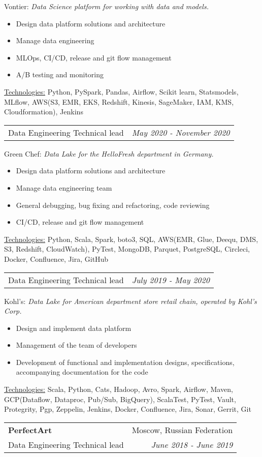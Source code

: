 \documentclass[letterpaper,11pt]{article}
\makeatletter
\newcommand{\sepsection}{\vspace{25pt}}
\newcommand{\resumeItem}[1]{%
  \item\small{
    #1
  }
}
\newcommand{\resumeSubheading}[4]{
  \vspace{8pt}\item%
    \begin{tabular*}{0.97\textwidth}[t]{l@{\extracolsep{\fill}}r}
      \textbf{#1} & #2 \\
      \textnormal{#3} & \textit{\small #4} \\
    \end{tabular*}\vspace{-5pt}
}
\newcommand{\resumeSubSubheading}[2]{
    \vspace{5pt}
    \begin{tabular*}{0.97\textwidth}{l@{\extracolsep{\fill}}r}
      \textnormal{#1} & \textit{\small #2} \\
    \end{tabular*}\vspace{-5pt}
}
\newcommand{\resumeProjectDescription}[2]{\vspace{5pt} \textnormal{#1:} \textit{\small#2}}
\newcommand{\resumeItemListStart}{\begin{itemize}}
\newcommand{\resumeItemListEnd}{\end{itemize}\vspace{-5pt}}
\newcommand{\resumeTech}[2]{
 \underline{#1:} #2
}
\makeatother
\begin{document}
      \resumeProjectDescription{Vontier}{Data Science platform for working with data and models.}

      \resumeItemListStart
      \resumeItem{Design data platform solutions and architecture}
      \resumeItem{Manage data engineering}
      \resumeItem{MLOps, CI/CD, release and git flow management}
      \resumeItem{A/B testing and monitoring}
      \resumeItemListEnd
      \resumeTech{Technologies}{Python, PySpark, Pandas, Airflow, Scikit learn, Statsmodels, MLflow, AWS(S3, EMR, EKS, Redshift, Kinesis, SageMaker, I​AM, KMS, Cloudformation), Jenkins}

    \resumeSubSubheading
      {Data Engineering Technical lead}{May 2020 - November 2020}

      \resumeProjectDescription{Green Chef}{Data Lake for the HelloFresh department in Germany.}

      \resumeItemListStart
      \resumeItem{Design data platform solutions and architecture}
      \resumeItem{Manage data engineering team}
      \resumeItem{General debugging, bug fixing and refactoring, code reviewing}
      \resumeItem{CI/CD, release and git flow management}
      \resumeItemListEnd
      \resumeTech{Technologies}{Python, Scala, Spark, boto3, SQL, AWS(EMR, Glue, Deequ, DMS, S3, Redshift, CloudWatch), PyTest, MongoDB, Parquet, PostgreSQL, Circleci, Docker, Confluence, Jira, GitHub}

    \resumeSubSubheading
      {Data Engineering Technical lead}{July 2019 - May 2020}

      \resumeProjectDescription{Kohl’s}{Data Lake for American department store retail chain, operated by Kohl's Corp.}

      \resumeItemListStart
      \resumeItem{Design and implement data platform}
      \resumeItem{Management of the team of developers}
      \resumeItem{Development of functional and implementation designs, specifications, accompanying documentation for the code}
      \resumeItemListEnd
      \resumeTech{Technologies}{Scala, Python, Cats, Hadoop, Avro, Spark, Airflow, Maven, GCP(Dataflow, Dataproc, Pub/Sub, BigQuery), ScalaTest, PyTest, Vault, Protegrity, Pgp, Zeppelin, Jenkins, Docker, Confluence, Jira, Sonar, Gerrit, Git}\\

    \sepsection

    \resumeSubheading
      {PerfectArt \href{https://perfectart.ru/}{\color{urlcolor}\faicon{link}}}{Moscow, Russian Federation}
      {Data Engineering Technical lead}{June 2018 - June 2019}
      
\end{document}
